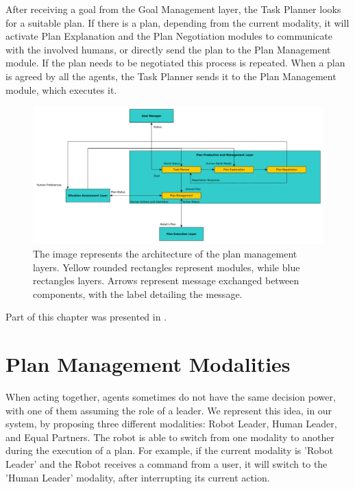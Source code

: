 After receiving a goal from the Goal Management layer, the Task Planner looks for a suitable plan. If there is a plan, depending from the current modality, it will activate Plan Explanation and the Plan Negotiation modules to communicate with the involved humans, or directly send the plan to the Plan Management module. If the plan needs to be negotiated this process is repeated. When a plan is agreed by all the agents, the Task Planner sends it to the Plan Management module, which executes it. 

\begin{figure}[h!]
	\centering
	\includegraphics[clip,scale=0.6]{img/plan_management/architecture.pdf}
	\caption{The image represents the architecture of the plan management layers. Yellow rounded rectangles represent modules, while blue rectangles layers. Arrows represent message exchanged between components, with the label detailing the message. }
	\label{fig:goal_management-goal_cycle}
\end{figure}


Part of this chapter was presented in \cite{Lallement2014,milliez2016using,fioreiser2014}.

\section{Plan Management Modalities}
\label{sec-plan_management-modalities}
When acting together, agents sometimes do not have the same decision power, with one of them assuming the role of a leader. We represent this idea, in our system, by proposing three different modalities: Robot Leader, Human Leader, and Equal Partners. The robot is able to switch from one modality to another during the execution of a plan. For example, if the current modality is 'Robot Leader' and the Robot receives a command from a user, it will switch to the 'Human Leader' modality, after interrupting its current action.

